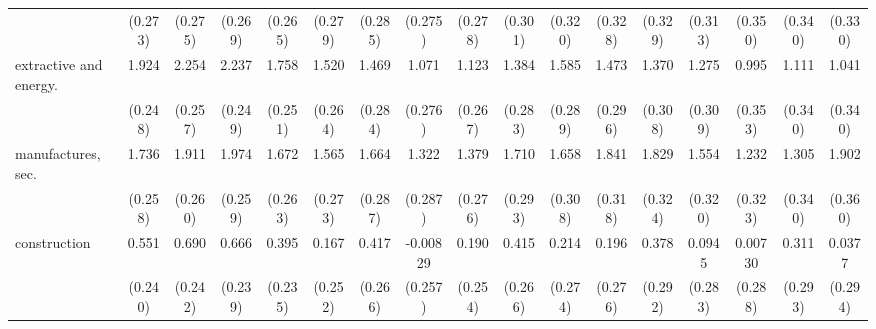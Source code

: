 {\begin{tabular}{l*{16}{c}}
                    &     (0.273)         &     (0.275)         &     (0.269)         &     (0.265)         &     (0.279)         &     (0.285)         &     (0.275)         &     (0.278)         &     (0.301)         &     (0.320)         &     (0.328)         &     (0.329)         &     (0.313)         &     (0.350)         &     (0.340)         &     (0.330)         \\
[1em]
extractive and energy.&       1.924\sym{***}&       2.254\sym{***}&       2.237\sym{***}&       1.758\sym{***}&       1.520\sym{***}&       1.469\sym{***}&       1.071\sym{***}&       1.123\sym{***}&       1.384\sym{***}&       1.585\sym{***}&       1.473\sym{***}&       1.370\sym{***}&       1.275\sym{***}&       0.995\sym{**} &       1.111\sym{**} &       1.041\sym{**} \\
                    &     (0.248)         &     (0.257)         &     (0.249)         &     (0.251)         &     (0.264)         &     (0.284)         &     (0.276)         &     (0.267)         &     (0.283)         &     (0.289)         &     (0.296)         &     (0.308)         &     (0.309)         &     (0.353)         &     (0.340)         &     (0.340)         \\
[1em]
manufactures, sec.  &       1.736\sym{***}&       1.911\sym{***}&       1.974\sym{***}&       1.672\sym{***}&       1.565\sym{***}&       1.664\sym{***}&       1.322\sym{***}&       1.379\sym{***}&       1.710\sym{***}&       1.658\sym{***}&       1.841\sym{***}&       1.829\sym{***}&       1.554\sym{***}&       1.232\sym{***}&       1.305\sym{***}&       1.902\sym{***}\\
                    &     (0.258)         &     (0.260)         &     (0.259)         &     (0.263)         &     (0.273)         &     (0.287)         &     (0.287)         &     (0.276)         &     (0.293)         &     (0.308)         &     (0.318)         &     (0.324)         &     (0.320)         &     (0.323)         &     (0.340)         &     (0.360)         \\
[1em]
construction        &       0.551\sym{*}  &       0.690\sym{**} &       0.666\sym{**} &       0.395         &       0.167         &       0.417         &    -0.00829         &       0.190         &       0.415         &       0.214         &       0.196         &       0.378         &      0.0945         &     0.00730         &       0.311         &      0.0377         \\
                    &     (0.240)         &     (0.242)         &     (0.239)         &     (0.235)         &     (0.252)         &     (0.266)         &     (0.257)         &     (0.254)         &     (0.266)         &     (0.274)         &     (0.276)         &     (0.292)         &     (0.283)         &     (0.288)         &     (0.293)         &     (0.294)         \\

\end{tabular}}
